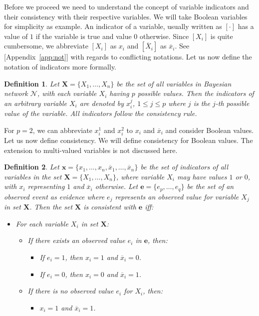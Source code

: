 \documentclass[a4paper,10pt]{article}
\theoremstyle{plain}
\newtheorem*{spn-def}{Definition}
\begin{document}
Before we proceed we need to understand the concept of variable indicators and their consistency
with their respective variables. We will take Boolean variables for simplicity as example. An
indicator of a variable, usually written as $[\cdot]$ has a value of $1$ if the variable is true
and value $0$ otherwise. Since $[X_i]$ is quite cumbersome, we abbreviate $[X_i]$ as $x_i$
and $[\overline{X}_i]$ as $\overline{x}_i$. See [Appendix~\ref{app:not}] with regards to
conflicting notations. Let us now define the notation of indicators more formally.

\begin{spn-def}
  Let $\mathbf{X}=\{X_1,\ldots,X_n\}$ be the set of all variables in Bayesian network
  $\mathcal{N}$, with each variable $X_i$ having $p$ possible values. Then the indicators of
  an arbitrary variable $X_i$ are denoted by $x_i^j$, $1\leq j \leq p$ where $j$ is the $j$-th
  possible value of the variable. All indicators follow the consistency rule.
\end{spn-def}

For $p=2$, we can abbreviate $x_i^1$ and $x_i^2$ to $x_i$ and $\overline{x}_i$ and consider
Boolean values. Let us now define consistency. We will define consistency for Boolean values. The
extension to multi-valued variables is not discussed here.

\begin{spn-def}
  Let $\mathbf{x}=\{x_1,\ldots,x_n,\overline{x}_1,\ldots,\overline{x}_n\}$ be the set of indicators
  of all variables in the set $\mathbf{X}=\{X_1,\ldots,X_n\}$, where variable $X_i$ may have values
  $1$ or $0$, with $x_i$ representing $1$ and $\overline{x}_i$ otherwise. Let $\mathbf{e}=\{e_p,
  \ldots,e_q\}$ be the set of an observed event as evidence where $e_j$ represents an observed
  value for variable $X_j$ in set $\mathbf{X}$. Then the set $\mathbf{X}$ is consistent with
  $\mathbf{e}$ iff:

  \begin{itemize}
    \item For each variable $X_i$ in set $\mathbf{X}$:
      \begin{itemize}
        \item If there exists an observed value $e_i$ in $\mathbf{e}$, then:
        \begin{itemize}
          \item If $e_i=1$, then $x_i=1$ and $\overline{x}_i=0$.
          \item If $e_i=0$, then $x_i=0$ and $\overline{x}_i=1$.
        \end{itemize}
        \item If there is no observed value $e_i$ for $X_i$, then:
        \begin{itemize}
          \item $x_i=1$ and $\overline{x}_i=1$.
        \end{itemize}
      \end{itemize}
  \end{itemize}
\end{spn-def}
\end{document}
